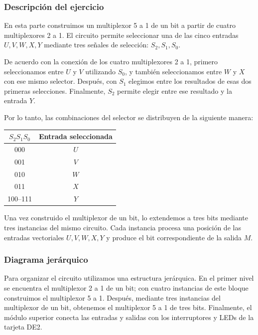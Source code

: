 \documentclass[12pt]{report}
\begin{document}
\subsubsection*{Descripción del ejercicio}
En esta parte construimos un multiplexor 5 a 1 de un bit a partir de cuatro multiplexores 2 a 1. El circuito permite seleccionar una de las cinco entradas $U,V,W,X,Y$ mediante tres señales de selección: $S_2,S_1,S_0$.

De acuerdo con la conexión de los cuatro multiplexores 2 a 1, primero seleccionamos entre $U$ y $V$ utilizando $S_0$, y también seleccionamos entre $W$ y $X$ con ese mismo selector. Después, con $S_1$ elegimos entre los resultados de esas dos primeras selecciones. Finalmente, $S_2$ permite elegir entre ese resultado y la entrada $Y$.

Por lo tanto, las combinaciones del selector se distribuyen de la siguiente manera:

\begin{center}
\begin{tabular}{|c|c|}
\hline
$S_2S_1S_0$ & Entrada seleccionada \\
\hline
000 & $U$ \\
001 & $V$ \\
010 & $W$ \\
011 & $X$ \\
100--111 & $Y$ \\
\hline
\end{tabular}
\end{center}

Una vez construido el multiplexor de un bit, lo extendemos a tres bits mediante tres instancias del mismo circuito. Cada instancia procesa una posición de las entradas vectoriales $U,V,W,X,Y$ y produce el bit correspondiente de la salida $M$.

\subsubsection*{Diagrama jerárquico}
Para organizar el circuito utilizamos una estructura jerárquica. En el primer nivel se encuentra el multiplexor 2 a 1 de un bit; con cuatro instancias de este bloque construimos el multiplexor 5 a 1. Después, mediante tres instancias del multiplexor de un bit, obtenemos el multiplexor 5 a 1 de tres bits. Finalmente, el módulo superior conecta las entradas y salidas con los interruptores y LEDs de la tarjeta DE2.

\end{document}
